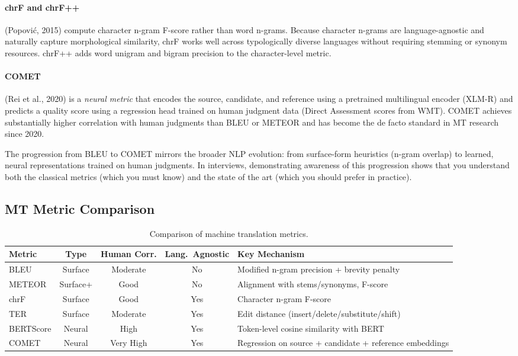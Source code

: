 \paragraph{chrF and chrF++} (Popovi\'{c}, 2015) compute character n-gram F-score
rather than word n-grams.  Because character n-grams are language-agnostic and
naturally capture morphological similarity, chrF works well across typologically
diverse languages without requiring stemming or synonym resources.  chrF++ adds
word unigram and bigram precision to the character-level metric.

\paragraph{COMET} (Rei et al., 2020) is a \emph{neural metric} that encodes the
source, candidate, and reference using a pretrained multilingual encoder (XLM-R)
and predicts a quality score using a regression head trained on human judgment
data (Direct Assessment scores from WMT).  COMET achieves substantially higher
correlation with human judgments than BLEU or METEOR and has become the de facto
standard in MT research since 2020.

\begin{keyinsight}
The progression from BLEU to COMET mirrors the broader NLP evolution: from
surface-form heuristics (n-gram overlap) to learned, neural representations
trained on human judgments.  In interviews, demonstrating awareness of this
progression shows that you understand both the classical metrics (which you must
know) and the state of the art (which you should prefer in practice).
\end{keyinsight}

\subsection{MT Metric Comparison}

\begin{table}[H]
\centering
\caption{Comparison of machine translation metrics.}
\label{tab:mt_metrics}
\begin{tabularx}{\textwidth}{@{}l c c c X@{}}
\toprule
\textbf{Metric} & \textbf{Type} & \textbf{Human Corr.} & \textbf{Lang.\ Agnostic} & \textbf{Key Mechanism} \\
\midrule
BLEU       & Surface    & Moderate  & No  & Modified n-gram precision + brevity penalty \\
METEOR     & Surface+   & Good      & No  & Alignment with stems/synonyms, F-score \\
chrF       & Surface    & Good      & Yes & Character n-gram F-score \\
TER        & Surface    & Moderate  & Yes & Edit distance (insert/delete/substitute/shift) \\
BERTScore  & Neural     & High      & Yes & Token-level cosine similarity with BERT \\
COMET      & Neural     & Very High & Yes & Regression on source + candidate + reference embeddings \\
\bottomrule
\end{tabularx}
\end{table}

